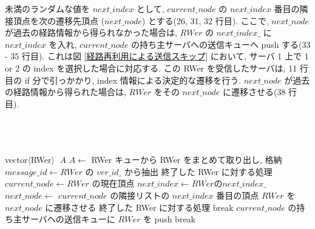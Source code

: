 未満のランダムな値を $next\_index$ として, $current\_node$ の $next\_index$ 番目の隣接頂点を次の遷移先頂点 ($next\_node$) とする(26, 31, 32 行目). ここで, $next\_node$ が過去の経路情報から得られなかった場合は, $RWer$ の $next\_index\_$ に $next\_index$ を入れ, $current\_node$ の持ち主サーバへの送信キューへ push する(33 - 35 行目). これは図 \ref{経路再利用による送信スキップ} において, サーバ 1 上で 1 or 2 の index を選択した場合に対応する. この RWer を受信したサーバは, 11 行目の if 分で引っかかり, index 情報による決定的な遷移を行う. $next\_node$ が過去の経路情報から得られた場合は, $RWer$ をその $next\_node$ に遷移させる(38 行目). 
\\
\\
\\
\\

\begin{algorithm}[p]
\DontPrintSemicolon
\nl vector$\langle$RWer$\rangle$ $\; A$\;
\nl $A \leftarrow$ RWer キューから RWer をまとめて取り出し, 格納\;
\nl {} {
\nl     $message\_id \leftarrow RWer$ の $ver\_id\_$ から抽出\;
\nl     {} {
\nl         終了した RWer に対する処理\;}
\nl     {} {
\nl         {} {
\nl             $current\_node \leftarrow RWer$ の現在頂点\;
\nl             {} {
\nl                 {} {
\nl                     $next\_index \leftarrow RWer の next\_index\_$\;
\nl                     $next\_node \leftarrow$ $current\_node$ の隣接リストの $next\_index$ 番目の頂点\;
\nl                     $RWer$ を $next\_node$ に遷移させる\;}
\nl                 {} {
\nl                     終了した RWer に対する処理\;
\nl                     break\;}
\nl                 {}}
\nl             {} {
\nl                 {} {
\nl                     $current\_node$ の持ち主サーバへの送信キューに $RWer$ を push\;
\nl                     break\;}
\nl                 {}}}}}
\end{algorithm}
